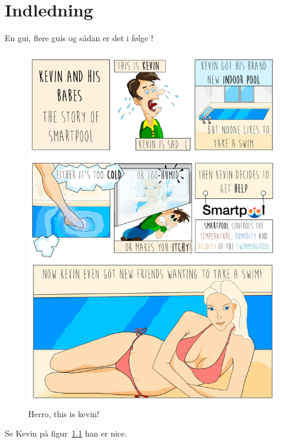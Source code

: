 \chapter{Indledning}

En \gls{gui}, flere \glspl{gui} og sådan er det i følge \cite{fysikbog}!

\begin{figure}
\centering
\includegraphics[width=0.1\linewidth]{figs/kevin.png}
\caption{Herro, this is kevin!}
\label{fig:kevin}
\end{figure}

Se Kevin på figur~\ref{fig:kevin} han er nice.

\lipsum[5-10]